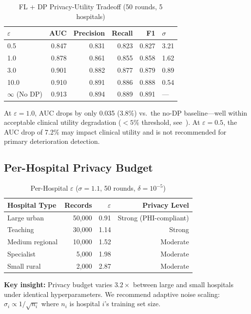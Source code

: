 \documentclass[10pt,journal,compsoc]{IEEEtran}
\begin{document}
\begin{table}[h]
\centering
\caption{FL + DP Privacy-Utility Tradeoff (50 rounds, 5 hospitals)}
\label{tab:dp-tradeoff}
\begin{tabular}{@{}lrrrrl@{}}
\toprule
$\varepsilon$ & AUC & Precision & Recall & F1 & $\sigma$ \\ \midrule
0.5  & 0.847 & 0.831 & 0.823 & 0.827 & 3.21 \\
1.0  & 0.878 & 0.861 & 0.855 & 0.858 & 1.62 \\
3.0  & 0.901 & 0.882 & 0.877 & 0.879 & 0.89 \\
10.0 & 0.910 & 0.891 & 0.886 & 0.888 & 0.54 \\
$\infty$ (No DP) & 0.913 & 0.894 & 0.889 & 0.891 & --- \\
\bottomrule
\end{tabular}
\end{table}

At $\varepsilon=1.0$, AUC drops by only 0.035 (3.8\%) vs.\ the
no-DP baseline---well within acceptable clinical utility degradation
($<5\%$ threshold, see~\cite{kaissis2021end}).
At $\varepsilon=0.5$, the AUC drop of 7.2\% may impact clinical
utility and is not recommended for primary deterioration detection.

\subsection{Per-Hospital Privacy Budget}

\begin{table}[h]
\centering
\caption{Per-Hospital $\varepsilon$ ($\sigma=1.1$, 50 rounds,
$\delta=10^{-5}$)}
\label{tab:per-hospital}
\begin{tabular}{@{}lrrr@{}}
\toprule
Hospital Type & Records & $\varepsilon$ & Privacy Level \\ \midrule
Large urban   & 50,000  & 0.91 & Strong (PHI-compliant) \\
Teaching      & 30,000  & 1.14 & Strong \\
Medium regional & 10,000 & 1.52 & Moderate \\
Specialist    & 5,000   & 1.98 & Moderate \\
Small rural   & 2,000   & 2.87 & Moderate \\
\bottomrule
\end{tabular}
\end{table}

\textbf{Key insight:} Privacy budget varies $3.2\times$ between
large and small hospitals under identical hyperparameters.
We recommend adaptive noise scaling:
$\sigma_i \propto 1/\sqrt{n_i}$ where $n_i$ is hospital $i$'s
training set size.
\end{document}
